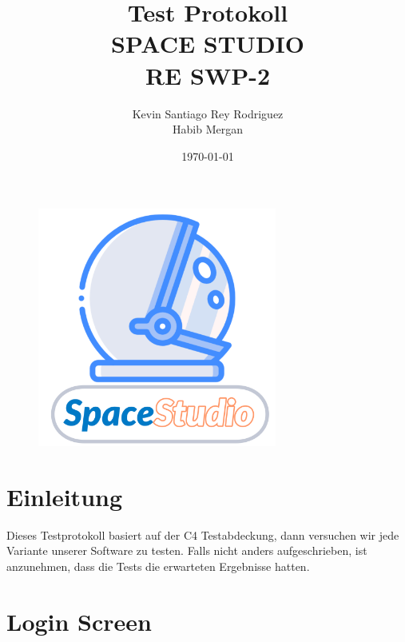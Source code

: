 \documentclass[12pt]{article}
\author{Kevin Santiago Rey Rodriguez\\
 Habib Mergan}
\date{\today}
\title{Test Protokoll\\
 SPACE STUDIO\\
 RE SWP-2}
\begin{document}
 \begin{figure}[!b]
  \centering
  \includegraphics[width=0.7\textwidth]{Architekturbeschreibung/pics/SpaceStudioLogo.png}\\
\end{figure}
\maketitle
\newpage
\tableofcontents

\newpage
\section{Einleitung}
Dieses Testprotokoll basiert auf der C4 Testabdeckung, dann versuchen wir jede Variante unserer Software zu testen. Falls nicht anders aufgeschrieben, ist anzunehmen, dass die Tests die erwarteten Ergebnisse hatten. 

\section{Login Screen}
\label{sec:orgc5dc561}
\end{document}
